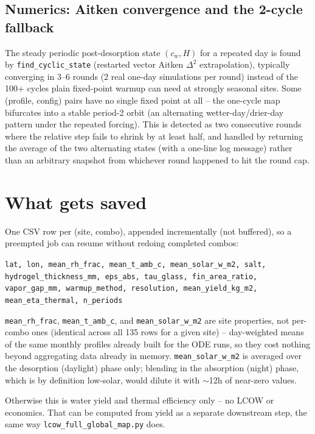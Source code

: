 \documentclass[11pt]{article}
\begin{document}
\subsection{Numerics: Aitken convergence and the 2-cycle fallback}
The steady periodic post-desorption state $(c_w, H)$ for a repeated day is found by
\texttt{find\_cyclic\_state} (restarted vector Aitken $\Delta^2$ extrapolation), typically
converging in 3--6 rounds (2 real one-day simulations per round) instead of the 100+ cycles
plain fixed-point warmup can need at strongly seasonal sites. Some (profile, config) pairs have
no single fixed point at all -- the one-cycle map bifurcates into a stable period-2 orbit (an
alternating wetter-day/drier-day pattern under the repeated forcing). This is detected as two
consecutive rounds where the relative step fails to shrink by at least half, and handled by
returning the average of the two alternating states (with a one-line log message) rather than an
arbitrary snapshot from whichever round happened to hit the round cap.

\section{What gets saved}

One CSV row per (site, combo), appended incrementally (not buffered), so a preempted job can
resume without redoing completed combos:

\begin{center}
\small
\texttt{lat, lon, mean\_rh\_frac, mean\_t\_amb\_c, mean\_solar\_w\_m2, salt,
hydrogel\_thickness\_mm, eps\_abs, tau\_glass, fin\_area\_ratio, vapor\_gap\_mm,
warmup\_method, resolution, mean\_yield\_kg\_m2, mean\_eta\_thermal, n\_periods}
\end{center}

\texttt{mean\_rh\_frac}, \texttt{mean\_t\_amb\_c}, and \texttt{mean\_solar\_w\_m2} are site
properties, not per-combo ones (identical across all 135 rows for a given site) -- day-weighted
means of the same monthly profiles already built for the ODE runs, so they cost nothing beyond
aggregating data already in memory. \texttt{mean\_solar\_w\_m2} is averaged over the desorption
(daylight) phase only; blending in the absorption (night) phase, which is by definition
low-solar, would dilute it with $\sim$12h of near-zero values.

Otherwise this is water yield and thermal efficiency only -- no LCOW or economics. That can be
computed from yield as a separate downstream step, the same way \texttt{lcow\_full\_global\_map.py}
does.
\end{document}
